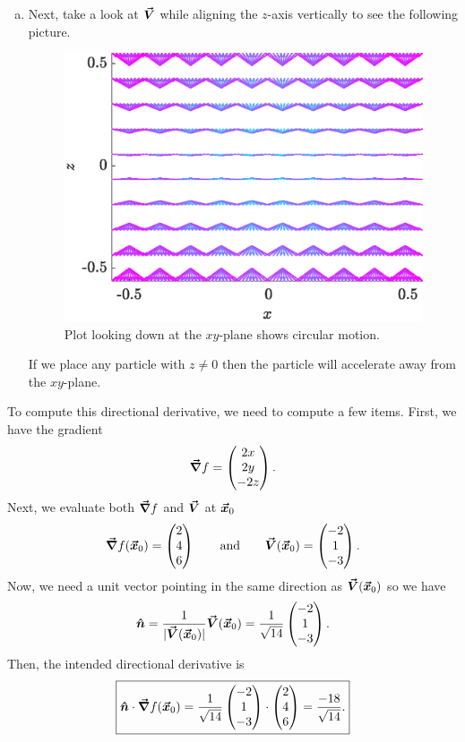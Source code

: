 \documentclass[12pt]{article} %
\begin{document}
\begin{solution}
\begin{enumerate}[(a)]
    \item Next, take a look at $\boldsymbol{\vec{V}}$ while aligning the $z$-axis vertically to see the following picture.
        \begin{figure}[H]
        \centering
        \includegraphics[width=.65\textwidth]{figures/6d}
        \caption{Plot looking down at the $xy$-plane shows circular motion.}
    \end{figure}
    If we place any particle with $z\neq 0$ then the particle will accelerate away from the $xy$-plane.
\end{enumerate}

    \item To compute this directional derivative, we need to compute a few items. First, we have the gradient
    \[
        \boldsymbol{\vec{\nabla}} f = \begin{pmatrix} 2x \\ 2y \\ -2z \end{pmatrix}.
    \]
    Next, we evaluate both $\boldsymbol{\vec{\nabla}} f$ and $\boldsymbol{\vec{V}}$ at $\boldsymbol{\vec{x}}_0$
    \[
    \boldsymbol{\vec{\nabla}} f(\boldsymbol{\vec{x}}_0) = \begin{pmatrix} 2 \\ 4 \\ 6 \end{pmatrix} \qquad \textrm{and} \qquad \boldsymbol{\vec{V}}(\boldsymbol{\vec{x}}_0) = \begin{pmatrix} -2 \\ 1 \\ -3 \end{pmatrix}.
    \]
    Now, we need a unit vector pointing in the same direction as $\boldsymbol{\vec{V}}(\boldsymbol{\vec{x}}_0)$ so we have
    \[
    \boldsymbol{\hat{n}} = \frac{1}{|\boldsymbol{\vec{V}}(\boldsymbol{\vec{x}}_0)|} \boldsymbol{\vec{V}}(\boldsymbol{\vec{x}}_0) = \frac{1}{\sqrt{14}} \begin{pmatrix} -2 \\ 1 \\ -3 \end{pmatrix}.
    \]
    Then, the intended directional derivative is
    \[
    \boxed{\boldsymbol{\hat{n}}\cdot \boldsymbol{\vec{\nabla}} f(\boldsymbol{\vec{x}}_0) = \frac{1}{\sqrt{14}} \begin{pmatrix} -2 \\ 1 \\ -3 \end{pmatrix} \cdot \begin{pmatrix} 2 \\ 4 \\ 6 \end{pmatrix} = \frac{-18}{\sqrt{14}}.}
    \]
\end{solution}
\end{document}
